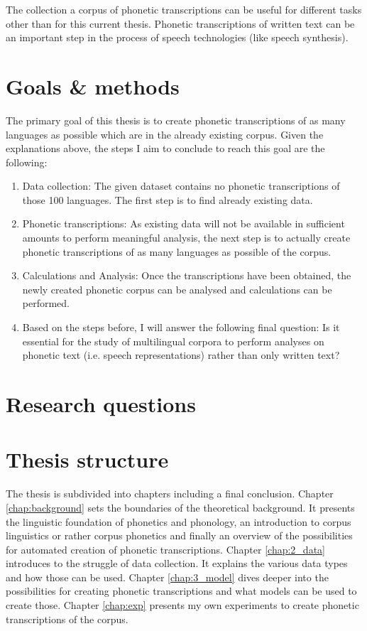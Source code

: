 The collection a corpus of phonetic transcriptions can be useful for different tasks other than for this current thesis. Phonetic transcriptions of written text can be an important step in the process of speech technologies (like speech synthesis). 


\section{Goals \& methods}
The primary goal of this thesis is to create phonetic transcriptions of as many languages as possible which are in the already existing corpus. Given the explanations above, the steps I aim to conclude to reach this goal are the following:
\begin{enumerate}
 \item Data collection: The given dataset contains no phonetic transcriptions of those 100 languages. The first step is to find already existing data. 
 \item Phonetic transcriptions: As existing data will not be available in sufficient amounts to perform meaningful analysis, the next step is to actually create phonetic transcriptions of as many languages as possible of the corpus. 
 \item Calculations and Analysis: Once the transcriptions have been obtained, the newly created phonetic corpus can be analysed and calculations can be performed.
 \item Based on the steps before, I will answer the following final question: Is it essential for the study of multilingual corpora to perform analyses on phonetic text (i.e. speech representations) rather than only written text? 
\end{enumerate}

\section{Research questions}
\label{outline}


\section{Thesis structure}

The thesis is subdivided into  chapters including a final conclusion. Chapter \ref{chap:background} sets the boundaries of the theoretical background. It presents the linguistic foundation of phonetics and phonology, an introduction to corpus linguistics or rather corpus phonetics and finally an overview of the possibilities for automated creation of phonetic transcriptions. Chapter \ref{chap:2_data} introduces to the struggle of data collection. It explains the various data types and how those can be used. Chapter \ref{chap:3_model} dives deeper into the possibilities for creating phonetic transcriptions and what models can be used to create those. Chapter \ref{chap:exp} presents my own experiments to create phonetic transcriptions of the corpus.



